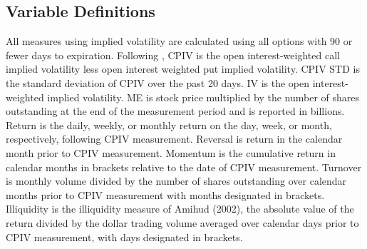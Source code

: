 \subsection{Variable Definitions}
All measures using implied volatility are calculated using all options with 90 or fewer days to expiration. Following \textcite{cremers2010deviations}, CPIV is the open interest-weighted call implied volatility less open interest weighted put implied volatility. CPIV STD is the standard deviation of CPIV over the past 20 days. IV is the open interest-weighted implied volatility. ME is stock price multiplied by the number of shares outstanding at the end of the measurement period and is reported in billions. Return is the daily, weekly, or monthly return on the day, week, or month, respectively, following CPIV measurement. Reversal is return in the calendar month prior to CPIV measurement. Momentum is the cumulative return in calendar months in brackets relative to the date of CPIV measurement. Turnover is monthly 
volume divided by the number of shares outstanding over calendar months prior to CPIV measurement with months designated in brackets. Illiquidity is the illiquidity measure of Amihud (2002), the absolute value of the return divided by the dollar trading volume averaged over calendar days prior to CPIV measurement, with days designated in brackets.

